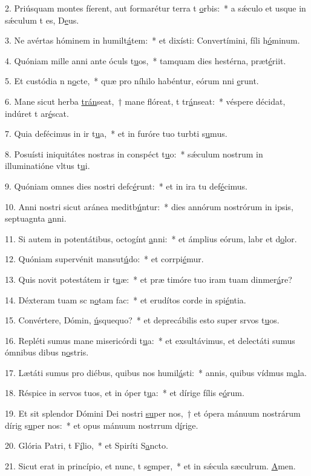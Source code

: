 2. Priúsquam montes fíerent, aut formarétur terra t \uline{o}rbis:~* a sǽculo et usque in sǽculum t es, D\uline{e}us.\par 
3. Ne avértas hóminem in humilt\uline{á}tem:~* et dixísti: Convertímini, fíli h\uline{ó}minum.\par 
4. Quóniam mille anni ante óculs t\uline{u}os,~* tamquam dies hestérna,  præt\uline{é}riit.\par 
5. Et custódia n n\uline{o}cte,~* quæ pro níhilo habéntur, eórum nni \uline{e}runt.\par 
6. Mane sicut herba \uline{trán}seat,~† mane flóreat, t tr\uline{á}nseat:~* véspere décidat, indúret t ar\uline{é}scat.\par 
7. Quia defécimus in ir t\uline{u}a,~* et in furóre tuo turbti s\uline{u}mus.\par 
8. Posuísti iniquitátes nostras in conspéct t\uline{u}o:~* sǽculum nostrum in illuminatióne vltus t\uline{u}i.\par 
9. Quóniam omnes dies nostri defc\uline{é}runt:~* et in ira tu def\uline{é}cimus.\par 
10. Anni nostri sicut aránea meditb\uline{ú}ntur:~* dies annórum nostrórum in ipsis, septuagnta \uline{a}nni.\par 
11. Si autem in potentátibus, octogínt \uline{a}nni:~* et ámplius eórum, labr et d\uline{o}lor.\par 
12. Quóniam supervénit mansut\uline{ú}do:~* et corrpi\uline{é}mur.\par 
13. Quis novit potestátem ir t\uline{u}æ:~* et præ timóre tuo iram tuam dinmer\uline{á}re?\par 
14. Déxteram tuam sc n\uline{o}tam fac:~* et erudítos corde in spi\uline{é}ntia.\par 
15. Convértere, Dómin, \uline{ú}squequo?~* et deprecábilis esto super srvos t\uline{u}os.\par 
16. Repléti sumus mane misericórdi t\uline{u}a:~* et exsultávimus, et delectáti sumus ómnibus dibus n\uline{o}stris.\par 
17. Lætáti sumus pro diébus, quibus nos humil\uline{á}sti:~* annis, quibus vídmus m\uline{a}la.\par 
18. Réspice in servos tuos, et in óper t\uline{u}a:~* et dírige fílis e\uline{ó}rum.\par 
19. Et sit splendor Dómini Dei nostri \uline{su}per nos,~† et ópera mánuum nostrárum dírig s\uline{u}per nos:~* et opus mánuum nostrrum d\uline{í}rige.\par 
20. Glória Patri, t F\uline{í}lio,~* et Spiríti S\uline{a}ncto.\par 
21. Sicut erat in princípio, et nunc, t s\uline{e}mper,~* et in sǽcula sæculrum. \uline{A}men.\par 
